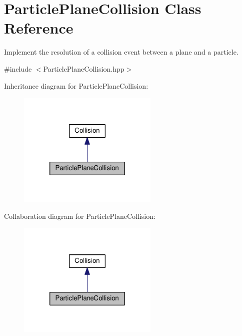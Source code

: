 \hypertarget{classParticlePlaneCollision}{\section{Particle\+Plane\+Collision Class Reference}
\label{classParticlePlaneCollision}
}


Implement the resolution of a collision event between a plane and a particle.  




{\ttfamily \#include $<$Particle\+Plane\+Collision.\+hpp$>$}



Inheritance diagram for Particle\+Plane\+Collision\+:\nopagebreak
\begin{figure}[H]
\begin{center}
\leavevmode
\includegraphics[width=190pt]{classParticlePlaneCollision__inherit__graph}
\end{center}
\end{figure}


Collaboration diagram for Particle\+Plane\+Collision\+:\nopagebreak
\begin{figure}[H]
\begin{center}
\leavevmode
\includegraphics[width=190pt]{classParticlePlaneCollision__coll__graph}
\end{center}
\end{figure}

